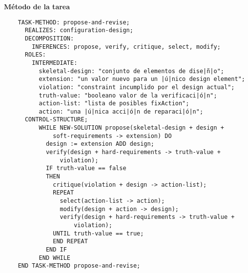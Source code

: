 \documentclass[12pt,a4paper,twoside,spanish]{article}      %
\begin{document}
\textbf {Método de la tarea}
\begin{lstlisting}
    TASK-METHOD: propose-and-revise;
      REALIZES: configuration-design;
      DECOMPOSITION:
        INFERENCES: propose, verify, critique, select, modify;
      ROLES:
        INTERMEDIATE:
          skeletal-design: "conjunto de elementos de dise|ñ|o";
          extension: "un valor nuevo para un |ú|nico design element";
          violation: "constraint incumplido por el design actual";
          truth-value: "booleano valor de la verificaci|ó|n";
          action-list: "lista de posibles fixAction";
          action: "una |ú|nica acci|ó|n de reparaci|ó|n";
      CONTROL-STRUCTURE;
          WHILE NEW-SOLUTION propose(skeletal-design + design +
              soft-requirements -> extension) DO
            design := extension ADD design;
            verify(design + hard-requirements -> truth-value +
                violation);
            IF truth-value == false
            THEN
              critique(violation + design -> action-list);
              REPEAT
                select(action-list -> action);
                modify(design + action -> design);
                verify(design + hard-requirements -> truth-value +
                    violation);
              UNTIL truth-value == true;
              END REPEAT
            END IF
          END WHILE
    END TASK-METHOD propose-and-revise;
\end{lstlisting}

\end{document}
